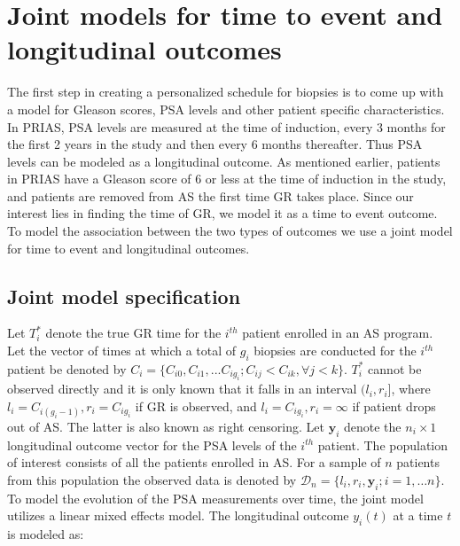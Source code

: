 
\section{Joint models for time to event and longitudinal outcomes}
\label{sec : jm_framework}
The first step in creating a personalized schedule for biopsies is to come up with a model for Gleason scores, PSA levels and other patient specific characteristics. In PRIAS, PSA levels are measured at the time of induction, every 3 months for the first 2 years in the study and then every 6 months thereafter. Thus PSA levels can be modeled as a longitudinal outcome. As mentioned earlier, patients in PRIAS have a Gleason score of 6 or less at the time of induction in the study, and patients are removed from AS the first time GR takes place. Since our interest lies in finding the time of GR, we model it as a time to event outcome. To model the association between the two types of outcomes we use a joint model for time to event and longitudinal outcomes.

\subsection{Joint model specification}
\label{subsec : jm_specification}
Let $T_i^*$ denote the true GR time for the $i^{th}$ patient enrolled in an AS program. Let the vector of times at which a total of $g_i$ biopsies are conducted for the $i^{th}$ patient be denoted by $C_i = \{C_{i0}, C_{i1}, ... C_{ig_i}; C_{ij} < C_{ik}, \forall j<k \}$. $T_i^*$ cannot be observed directly and it is only known that it falls in an interval $(l_i, r_i]$, where $l_i = C_{i(g_i-1)}, r_i = C_{ig_i}$ if GR is observed, and $l_i = C_{ig_i}, r_i=\infty$ if patient drops out of AS. The latter is also known as right censoring. Let $\boldsymbol{y}_i$ denote the $n_i \times 1$ longitudinal outcome vector for the PSA levels of the $i^{th}$ patient. The population of interest consists of all the patients enrolled in AS. For a sample of $n$ patients from this population the observed data is denoted by $\mathcal{D}_n = \{l_i, r_i, \boldsymbol{y}_i; i = 1, \ldots n\}$.\\

To model the evolution of the PSA measurements over time,  the joint model utilizes a linear mixed effects model. The longitudinal outcome $y_i(t)$ at a time $t$ is modeled as:

